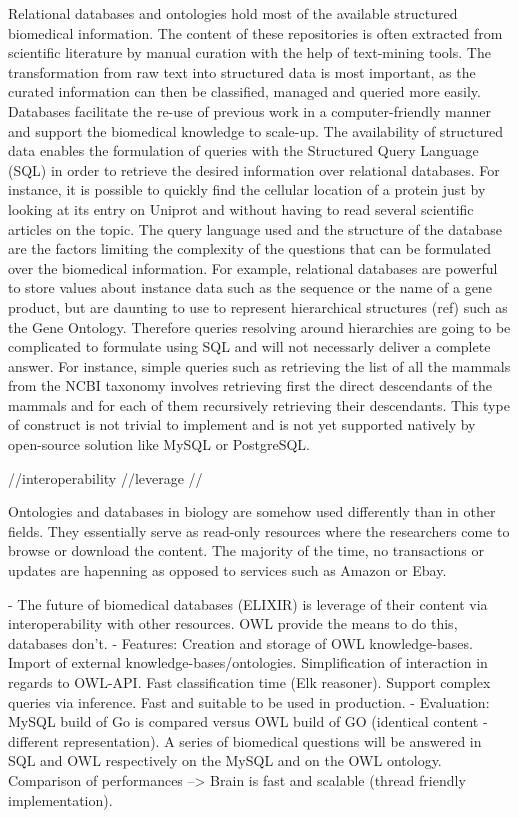 \documentclass{bioinfo}
\begin{document}
Relational databases and ontologies hold most of the available structured biomedical information. The content of these repositories is often
extracted from scientific literature by manual curation with the help of text-mining tools. The transformation from raw text into
structured data is most important, as the curated information can then be classified, managed and queried more easily. Databases facilitate
the re-use of previous work in a computer-friendly manner and support the biomedical knowledge to scale-up. 
The availability of structured data enables the formulation of queries with the Structured Query Language (SQL) in order to retrieve the desired 
information over relational databases. For instance, it is possible to
quickly find the cellular location of a protein just by looking at its entry on Uniprot and without having to read several scientific articles
on the topic. The query language used and the structure of the database are the factors limiting the complexity of the questions that can be 
formulated over the biomedical information. For example, relational databases are powerful to store values about instance data such as the
sequence or the name of a gene product, but are daunting to use to represent hierarchical structures (ref) such as the Gene Ontology. Therefore
queries resolving around hierarchies are going to be complicated to formulate using SQL and will not necessarly deliver a complete answer. For
instance, simple queries such as retrieving the list of all the mammals from the NCBI taxonomy involves retrieving first the direct descendants
of the mammals and for each of them recursively retrieving their descendants. This type of construct is not trivial to implement
and is not yet supported natively by open-source solution like MySQL or PostgreSQL. 


//interoperability
//leverage
//



Ontologies and databases in biology are somehow used differently than in other fields. They essentially serve as read-only 
resources where the researchers come to browse or download the content. The majority of the time, no transactions or updates 
are hapenning as opposed to services such as Amazon or Ebay.

- The future of biomedical databases (ELIXIR) is leverage of their content via interoperability with other resources.
OWL provide the means to do this, databases don't.
- Features: Creation and storage of OWL knowledge-bases. 
Import of external knowledge-bases/ontologies. 
Simplification of interaction in regards to OWL-API. Fast classification time (Elk reasoner). 
Support complex queries via inference. Fast and suitable to be used in production.
- Evaluation: MySQL build of Go is compared versus OWL build of GO (identical content - different representation).
A series of biomedical questions will be answered in SQL and OWL respectively on the MySQL and on the OWL ontology.
Comparison of performances --> Brain is fast and scalable (thread friendly implementation).
\end{document}
